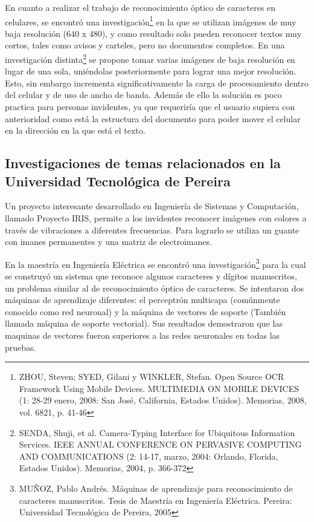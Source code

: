 \documentclass[a4paper, 11pt, oneside]{report}
\begin{document}
En cuanto a realizar el trabajo de reconocimiento óptico de caracteres en celulares, se encontró una investigación\footnote{ZHOU, Steven; SYED, Gilani y WINKLER, Stefan. Open Source OCR Framework Using Mobile Devices. MULTIMEDIA ON MOBILE DEVICES (1: 28-29 enero, 2008: San José, California, Estados Unidos). Memorias, 2008, vol. 6821, p. 41-46} en la que se utilizan imágenes de muy baja resolución (640 x 480), y como resultado solo pueden reconocer textos muy cortos, tales como avisos y carteles, pero no documentos completos. En una investigación distinta\footnote{SENDA, Shuji, et al. Camera-Typing Interface for Ubiquitous Information Services. IEEE ANNUAL CONFERENCE ON PERVASIVE COMPUTING AND COMMUNICATIONS (2: 14-17, marzo, 2004: Orlando, Florida, Estados Unidos). Memorias, 2004, p. 366-372} se propone tomar varias imágenes de baja resolución en lugar de una sola, uniéndolas posteriormente para lograr una mejor resolución. Esto, sin embargo incrementa significativamente la carga de procesamiento dentro del celular y de uso de ancho de banda. Además de ello la solución es poco practica para personas invidentes, ya que requeriría que el usuario supiera con anterioridad como está la estructura del documento para poder mover el celular en la dirección en la que está el texto.
	
\subsection{Investigaciones de temas relacionados en la Universidad Tecnológica de Pereira}

Un proyecto interesante desarrollado en Ingeniería de Sistemas y Computación, llamado Proyecto IRIS, permite a los invidentes reconocer imágenes con colores a través de vibraciones a diferentes frecuencias. Para lograrlo se utiliza un guante con imanes permanentes y una matriz de electroimanes.

En la maestría en Ingeniería Eléctrica se encontró una investigación\footnote{MUÑOZ, Pablo Andrés. Máquinas de aprendizaje para reconocimiento de caracteres manuscritos. Tesis de Maestría en Ingeniería Eléctrica. Pereira: Universidad Tecnológica de Pereira, 2005} para la cual se construyó un sistema que reconoce algunos caracteres y dígitos manuscritos, un problema similar al de reconocimiento óptico de caracteres. Se intentaron dos máquinas de aprendizaje diferentes: el perceptrón multicapa (comúnmente conocido como red neuronal) y la máquina de vectores de soporte (También llamada máquina de soporte vectorial). Sus resultados demostraron que las maquinas de vectores fueron superiores a las redes neuronales en todas las pruebas.
    
\end{document}
